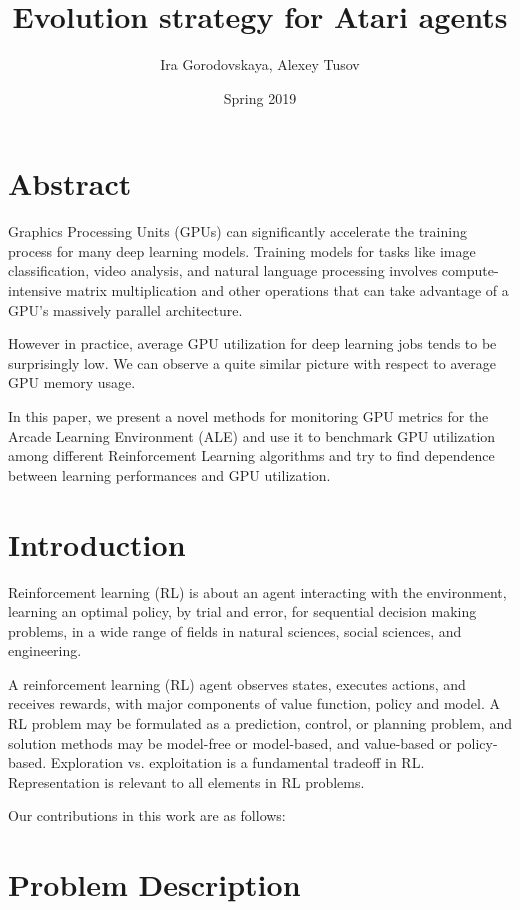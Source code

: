 \documentclass[11 pt, twocolumn]{article}
\title{Evolution strategy for Atari agents}
\author{Ira Gorodovskaya, Alexey Tusov}
\date{Spring 2019}
\begin{document}
\maketitle
\section{Abstract}
Graphics Processing Units (GPUs) can significantly accelerate the training process for many deep learning models. Training models for tasks like image classification, video analysis, and natural language processing involves compute-intensive matrix multiplication and other operations that can take advantage of a GPU's massively parallel architecture.

However in practice, average GPU utilization for deep learning jobs tends to be surprisingly low. We can observe a quite similar picture with respect to average GPU memory usage.

In this paper, we present a novel methods for monitoring GPU metrics for the Arcade Learning Environment (ALE) and use it to benchmark GPU utilization among different Reinforcement Learning algorithms and try to find dependence between learning performances and GPU utilization.


\section{Introduction}
Reinforcement learning (RL) is about an agent interacting with the environment, learning an optimal
policy, by trial and error, for sequential decision making problems, in a wide range of fields in natural
sciences, social sciences, and engineering.

A reinforcement learning (RL) agent observes states, executes actions, and receives rewards, with
major components of value function, policy and model. A RL problem may be formulated as a
prediction, control, or planning problem, and solution methods may be model-free or model-based,
and value-based or policy-based. Exploration vs. exploitation is a fundamental tradeoff in RL.
Representation is relevant to all elements in RL problems.

Our contributions in this work are as follows:



\section{Problem Description}
\end{document}
